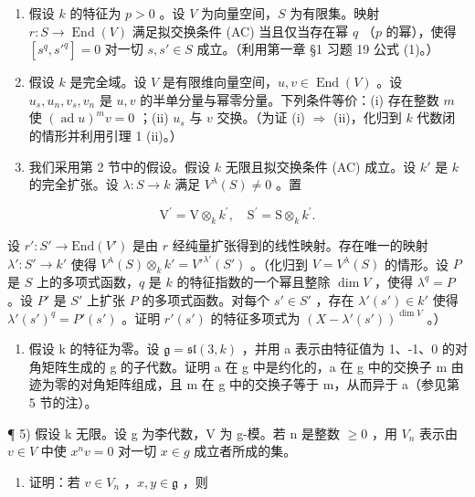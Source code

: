 
\begin{enumerate}
\def\labelenumi{\arabic{enumi})}
\item
  假设 \(k\) 的特征为 \(p > 0\) 。设 \(V\) 为向量空间，\(S\) 为有限集。映射 \(r: S \to \operatorname{End}(V)\) 满足拟交换条件 (AC) 当且仅当存在幂 \(q\) （\(p\) 的幂），使得 \([s^q, s'^q] = 0\) 对一切 \(s, s' \in S\) 成立。（利用第一章 §1 习题 19 公式 (1)。）
\item
  假设 \(k\) 是完全域。设 \(V\) 是有限维向量空间，\(u, v \in \operatorname{End}(V)\) 。设 \(u_s, u_n, v_s, v_n\) 是 \(u, v\) 的半单分量与幂零分量。下列条件等价：(i) 存在整数 \(m\) 使 \((\operatorname{ad} u)^m v = 0\) ；(ii) \(u_s\) 与 \(v\) 交换。（为证 (i) \(\Longrightarrow\) (ii)，化归到 \(k\) 代数闭的情形并利用引理 1 (ii)。）
\item
  我们采用第 2 节中的假设。假设 \(k\) 无限且拟交换条件 (AC) 成立。设 \(k'\) 是 \(k\) 的完全扩张。设 \(\lambda : S \to k\) 满足 \(V^{\lambda}(S) \neq 0\) 。置
\end{enumerate}

\[
\mathrm{V} ^ {\prime} = \mathrm{V} \otimes_ {k} k ^ {\prime}, \quad \mathrm{S} ^ {\prime} = \mathrm{S} \otimes_ {k} k ^ {\prime}.
\]

设 \(r' : S' \to \text{End}(V')\) 是由 \(r\) 经纯量扩张得到的线性映射。存在唯一的映射 \(\lambda' : S' \to k'\) 使得 \(V^{\lambda}(S) \otimes_k k' = V'^{\lambda'}(S')\) 。（化归到 \(V = V^{\lambda}(S)\) 的情形。设 \(P\) 是 \(S\) 上的多项式函数，\(q\) 是 \(k\) 的特征指数的一个幂且整除 \(\dim V\) ，使得 \(\lambda^q = P\) 。设 \(P'\) 是 \(S'\) 上扩张 \(P\) 的多项式函数。对每个 \(s' \in S'\) ，存在 \(\lambda'(s') \in k'\) 使得 \(\lambda'(s')^q = P'(s')\) 。证明 \(r'(s')\) 的特征多项式为 \((X - \lambda'(s'))^{\dim V}\) 。）

\begin{enumerate}
\def\labelenumi{\arabic{enumi})}
\setcounter{enumi}{3}
\tightlist
\item
  假设 k 的特征为零。设 \(\mathfrak{g} = \mathfrak{sl}(3, k)\) ，并用 a 表示由特征值为 1、-1、0 的对角矩阵生成的 g 的子代数。证明 a 在 g 中是约化的，a 在 g 中的交换子 m 由迹为零的对角矩阵组成，且 m 在 g 中的交换子等于 m，从而异于 a（参见第 5 节的注）。
\end{enumerate}

¶ 5) 假设 k 无限。设 g 为李代数，V 为 g-模。若 n 是整数 \(\geq 0\) ，用 \(V_{n}\) 表示由 \(v \in V\) 中使 \(x^{n}v = 0\) 对一切 \(x \in g\) 成立者所成的集。

\begin{enumerate}
\def\labelenumi{\alph{enumi})}
\tightlist
\item
  证明：若 \(v \in V_n\) ，\(x, y \in \mathfrak{g}\) ，则
\end{enumerate}

